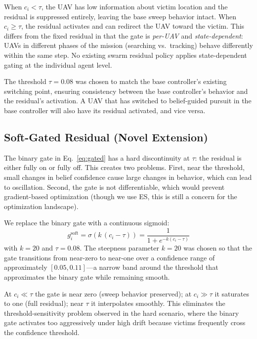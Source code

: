 \documentclass[journal]{IEEEtran}
\begin{document}
When $c_i < \tau$, the UAV has low information about victim location and the residual
is suppressed entirely, leaving the base sweep behavior intact. When $c_i \geq \tau$,
the residual activates and can redirect the UAV toward the victim. This differs from
the fixed residual in that the gate is \emph{per-UAV} and \emph{state-dependent}:
UAVs in different phases of the mission (searching vs.\ tracking) behave differently
within the same step. No existing swarm residual policy applies state-dependent gating
at the individual agent level.

The threshold $\tau = 0.08$ was chosen to match the base controller's existing
switching point, ensuring consistency between the base controller's behavior and the
residual's activation. A UAV that has switched to belief-guided pursuit in the base
controller will also have its residual activated, and vice versa.

\subsection{Soft-Gated Residual (Novel Extension)}
\label{sec:soft}

The binary gate in Eq.~\eqref{eq:gated} has a hard discontinuity at $\tau$: the
residual is either fully on or fully off. This creates two problems. First, near the
threshold, small changes in belief confidence cause large changes in behavior, which
can lead to oscillation. Second, the gate is not differentiable, which would prevent
gradient-based optimization (though we use ES, this is still a concern for the
optimization landscape).

We replace the binary gate with a continuous sigmoid:
\begin{equation}
  g_i^{\text{soft}} = \sigma\!\left(k\,(c_i - \tau)\right)
    = \frac{1}{1+e^{-k(c_i-\tau)}}
  \label{eq:soft}
\end{equation}
with $k = 20$ and $\tau = 0.08$. The steepness parameter $k = 20$ was chosen so that
the gate transitions from near-zero to near-one over a confidence range of
approximately $[0.05, 0.11]$---a narrow band around the threshold that approximates
the binary gate while remaining smooth.

At $c_i \ll \tau$ the gate is near zero (sweep behavior preserved); at $c_i \gg \tau$
it saturates to one (full residual); near $\tau$ it interpolates smoothly. This
eliminates the threshold-sensitivity problem observed in the hard scenario, where the
binary gate activates too aggressively under high drift because victims frequently
cross the confidence threshold.
\end{document}
